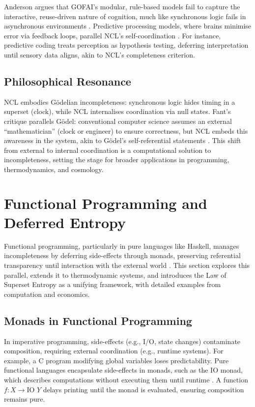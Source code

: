\documentclass{article}
\begin{document}
Anderson argues that GOFAI's modular, rule-based models fail to capture the interactive, reuse-driven nature of cognition, much like synchronous logic fails in asynchronous environments \citep{anderson2006}. Predictive processing models, where brains minimise error via feedback loops, parallel NCL's self-coordination \citep{clark2013, hohwy2013}. For instance, predictive coding treats perception as hypothesis testing, deferring interpretation until sensory data aligns, akin to NCL's completeness criterion.

\subsection{Philosophical Resonance}
NCL embodies G\"{o}delian incompleteness: synchronous logic hides timing in a superset (clock), while NCL internalises coordination via null states. Fant's critique parallels G\"{o}del: conventional computer science assumes an external ``mathematician'' (clock or engineer) to ensure correctness, but NCL embeds this awareness in the system, akin to G\"{o}del's self-referential statements \citep{fant2005, nagel1958}. This shift from external to internal coordination is a computational solution to incompleteness, setting the stage for broader applications in programming, thermodynamics, and cosmology.

\section{Functional Programming and Deferred Entropy}
\label{sec:programming_entropy}
Functional programming, particularly in pure languages like Haskell, manages incompleteness by deferring side-effects through monads, preserving referential transparency until interaction with the external world \citep{wadler1992, turner1979}. This section explores this parallel, extends it to thermodynamic systems, and introduces the Law of Superset Entropy as a unifying framework, with detailed examples from computation and economics.

\subsection{Monads in Functional Programming}
In imperative programming, side-effects (e.g., I/O, state changes) contaminate composition, requiring external coordination (e.g., runtime systems). For example, a C program modifying global variables loses predictability. Pure functional languages encapsulate side-effects in monads, such as the IO monad, which describes computations without executing them until runtime \citep{wadler1992}. A function \( f : X \to \text{IO } Y \) delays printing until the monad is evaluated, ensuring composition remains pure.
\end{document}
